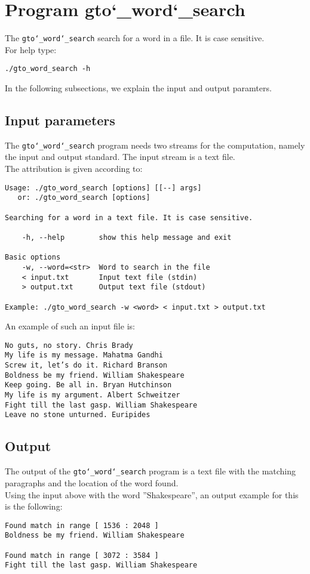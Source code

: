 \section{Program gto\char`_word\char`_search}
The \texttt{gto\char`_word\char`_search} search for a word in a file. It is case sensitive.\\
For help type:
\begin{lstlisting}
./gto_word_search -h
\end{lstlisting}
In the following subsections, we explain the input and output paramters.

\subsection*{Input parameters}

The \texttt{gto\char`_word\char`_search} program needs two streams for the computation, namely the input and output standard. The input stream is a text file.\\
The attribution is given according to:
\begin{lstlisting}
Usage: ./gto_word_search [options] [[--] args]
   or: ./gto_word_search [options]

Searching for a word in a text file. It is case sensitive.

    -h, --help        show this help message and exit

Basic options
    -w, --word=<str>  Word to search in the file
    < input.txt       Input text file (stdin)
    > output.txt      Output text file (stdout)

Example: ./gto_word_search -w <word> < input.txt > output.txt
\end{lstlisting}
An example of such an input file is:
\begin{lstlisting}
No guts, no story. Chris Brady
My life is my message. Mahatma Gandhi
Screw it, let’s do it. Richard Branson
Boldness be my friend. William Shakespeare
Keep going. Be all in. Bryan Hutchinson
My life is my argument. Albert Schweitzer
Fight till the last gasp. William Shakespeare
Leave no stone unturned. Euripides
\end{lstlisting}

\subsection*{Output}
The output of the \texttt{gto\char`_word\char`_search} program is a text file with the matching paragraphs and the location of the word found.\\
Using the input above with the word ''Shakespeare'', an output example for this is the following:
\begin{lstlisting}
Found match in range [ 1536 : 2048 ]
Boldness be my friend. William Shakespeare

Found match in range [ 3072 : 3584 ]
Fight till the last gasp. William Shakespeare
\end{lstlisting}